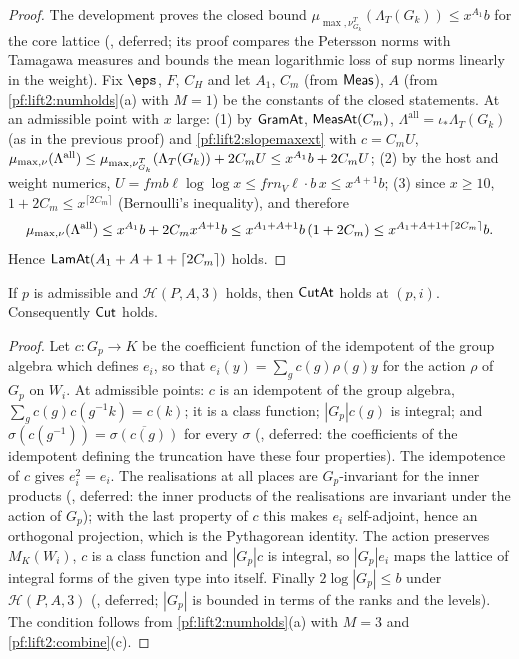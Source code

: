 \begin{proof}
The development proves the closed bound $\mu_{\max,\nu^T_{G_k}}(\Lambda_T(G_k))\le x^{A_1}b$ for the core lattice
(, deferred; its proof compares the
Petersson norms with Tamagawa measures and bounds the mean logarithmic loss of sup norms linearly in the weight).
Fix $\eps$, $F$, $C_H$ and let $A_1$, $C_m$ (from $\mathsf{Meas}$), $A$ (from \cref{pf:lift2:numholds}(a) with
$M=1$) be the constants of the closed statements. At an admissible point with $x$ large: (1) by $\mathsf{GramAt}$,
$\mathsf{MeasAt}(C_m)$, $\Lambda^{\mathrm{all}}=\iota_*\Lambda_T(G_k)$ (as in the previous proof) and
\cref{pf:lift2:slopemaxext} with $c=C_mU$, $\mu_{\max,\nu}(\Lambda^{\mathrm{all}})\le\mu_{\max,\nu^T_{G_k}}(\Lambda_T(G_k))+2C_mU
\le x^{A_1}b+2C_mU$; (2) by the host and weight numerics, $U=fmb\ell\log\log x\le frn_V\ell\cdot b\,x\le x^{A+1}b$;
(3) since $x\ge10$, $1+2C_m\le x^{\lceil2C_m\rceil}$ (Bernoulli's inequality), and therefore
\[
\mu_{\max,\nu}(\Lambda^{\mathrm{all}})\le x^{A_1}b+2C_mx^{A+1}b\le x^{A_1+A+1}b\,(1+2C_m)\le x^{A_1+A+1+\lceil2C_m\rceil}b.
\]
Hence $\mathsf{LamAt}(A_1+A+1+\lceil2C_m\rceil)$ holds.
\end{proof}

\begin{proposition}[Truncation]\label{pf:lift2:cut}
If $p$ is admissible and $\mathcal H(P,A,3)$ holds, then $\mathsf{CutAt}$ holds at $(p,i)$. Consequently
$\mathsf{Cut}$ holds.
\end{proposition}

\begin{proof}
Let $c\colon G_p\to K$ be the coefficient function of the idempotent of the group algebra which defines $e_i$, so that
$e_i(y)=\sum_gc(g)\rho(g)y$ for the action $\rho$ of $G_p$ on $W_i$. At admissible points: $c$ is an idempotent of the
group algebra, $\sum_gc(g)c(g^{-1}k)=c(k)$; it is a class function; $|G_p|c(g)$ is integral; and
$\sigma(c(g^{-1}))=\overline{\sigma(c(g))}$ for every $\sigma$
(, deferred: the coefficients of the idempotent defining
the truncation have these four properties). The idempotence of $c$ gives $e_i^2=e_i$. The realisations at all places
are $G_p$-invariant for the inner products (, deferred: the
inner products of the realisations are invariant under the action of $G_p$); with the last property of $c$ this makes
$e_i$ self-adjoint, hence an orthogonal projection, which is the Pythagorean identity. The action preserves
$M_K(W_i)$, $c$ is a class function and $|G_p|c$ is integral, so $|G_p|e_i$ maps the lattice of integral forms of the
given type into itself. Finally $2\log|G_p|\le b$ under $\mathcal H(P,A,3)$
(, deferred; $|G_p|$ is bounded in terms of the ranks and the
levels). The condition follows from \cref{pf:lift2:numholds}(a) with $M=3$ and \cref{pf:lift2:combine}(c).
\end{proof}

